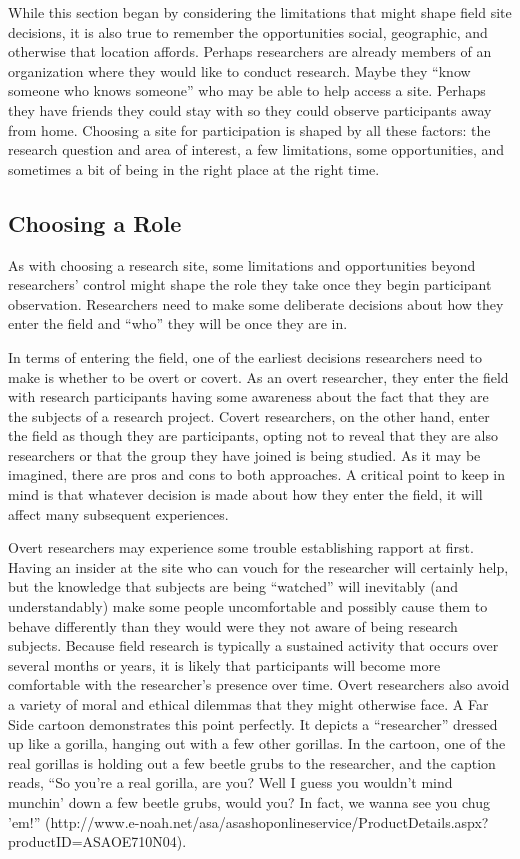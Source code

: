 While this section began by considering the limitations that might shape field site decisions, it is also true to remember the opportunities \textemdash social, geographic, and otherwise \textemdash that location affords. Perhaps researchers are already members of an organization where they would like to conduct research. Maybe they ``know someone who knows someone'' who may be able to help access a site. Perhaps they have friends they could stay with so they could observe participants away from home. Choosing a site for participation is shaped by all these factors: the research question and area of interest, a few limitations, some opportunities, and sometimes a bit of being in the right place at the right time.

\subsection{Choosing a Role}

As with choosing a research site, some limitations and opportunities beyond researchers' control might shape the role they take once they begin participant observation. Researchers need to make some deliberate decisions about how they enter the field and ``who'' they will be once they are in.

In terms of entering the field, one of the earliest decisions researchers need to make is whether to be overt or covert. As an overt researcher, they enter the field with research participants having some awareness about the fact that they are the subjects of a research project. Covert researchers, on the other hand, enter the field as though they are participants, opting not to reveal that they are also researchers or that the group they have joined is being studied. As it may be imagined, there are pros and cons to both approaches. A critical point to keep in mind is that whatever decision is made about how they enter the field, it will affect many subsequent experiences.

Overt researchers may experience some trouble establishing rapport at first. Having an insider at the site who can vouch for the researcher will certainly help, but the knowledge that subjects are being ``watched'' will inevitably (and understandably) make some people uncomfortable and possibly cause them to behave differently than they would were they not aware of being research subjects. Because field research is typically a sustained activity that occurs over several months or years, it is likely that participants will become more comfortable with the researcher's presence over time. Overt researchers also avoid a variety of moral and ethical dilemmas that they might otherwise face. A Far Side cartoon demonstrates this point perfectly. It depicts a ``researcher'' dressed up like a gorilla, hanging out with a few other gorillas. In the cartoon, one of the real gorillas is holding out a few beetle grubs to the researcher, and the caption reads, ``So you’re a real gorilla, are you? Well I guess you wouldn’t mind munchin’ down a few beetle grubs, would you? In fact, we wanna see you chug ’em!'' (http://www.e-noah.net/asa/asashoponlineservice/ProductDetails.aspx?productID=ASAOE710N04).

